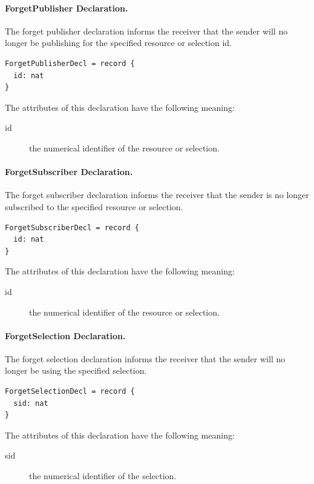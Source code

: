 \documentclass[a4paper,oneside,article]{memoir}
\begin{document}
\paragraph{ForgetPublisher Declaration.} The forget publisher declaration informs the receiver that
the sender will no longer be publishing for the specified resource or selection id.
\begin{verbatim}
ForgetPublisherDecl = record {
  id: nat
}
\end{verbatim}
The attributes of this declaration have the following meaning:
\begin{description}
\item[id] the numerical identifier of the resource or selection.
\end{description}

\paragraph{ForgetSubscriber Declaration.} The forget subscriber declaration informs the receiver
that the sender is no longer subscribed to the specified resource or selection.
\begin{verbatim}
ForgetSubscriberDecl = record {
  id: nat
}
\end{verbatim}
The attributes of this declaration have the following meaning:
\begin{description}
\item[id] the numerical identifier of the resource or selection.
\end{description}

\paragraph{ForgetSelection Declaration.} The forget selection declaration informs the receiver that
the sender will no longer be using the specified selection.
\begin{verbatim}
ForgetSelectionDecl = record {
  sid: nat
}
\end{verbatim}
The attributes of this declaration have the following meaning:
\begin{description}
\item[sid] the numerical identifier of the selection.
\end{description}
\end{document}
